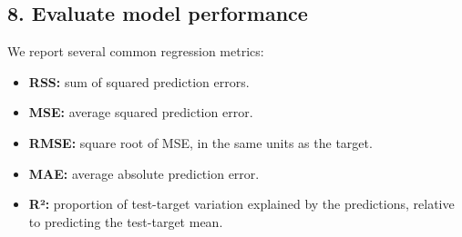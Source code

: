 \documentclass[1pt]{article}
\providecommand{\tightlist}{%
    \setlength{\itemsep}{0pt}\setlength{\parskip}{0pt}}
\begin{document}
    \hypertarget{evaluate-model-performance}{%
        \subsection{8. Evaluate model
        performance}\label{evaluate-model-performance}}

    We report several common regression metrics:

    \begin{itemize}
        \tightlist
        \item
        \textbf{RSS:} sum of squared prediction errors.
        \item
        \textbf{MSE:} average squared prediction error.
        \item
        \textbf{RMSE:} square root of MSE, in the same units as the target.
        \item
        \textbf{MAE:} average absolute prediction error.
        \item
        \textbf{R²:} proportion of test-target variation explained by the
        predictions, relative to predicting the test-target mean.
    \end{itemize}
\end{document}
